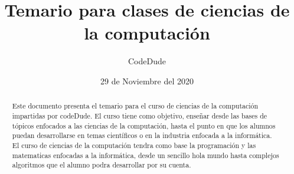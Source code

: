 \documentclass[12pt, letterpaper]{article}
\author{CodeDude}
\title{Temario para clases de ciencias de la computación}
\date{29 de Noviembre del 2020}
\begin{document}
\maketitle
\newpage
\begin{abstract}
Este documento presenta el temario para el curso de ciencias de la computación impartidas por codeDude. El curso tiene como objetivo, enseñar
desde las bases de tópicos enfocados a las ciencias de la computación, hasta el punto en que los alumnos puedan desarrollarse en temas científicos
o en la industria enfocada a la informática.\\
El curso de ciencias de la computación tendra como base la programación y las matematicas enfocadas a la informática, desde un sencillo hola mundo
hasta complejos algoritmos que el alumno podra desarrollar por su cuenta.
\end{abstract}
\end{document}
